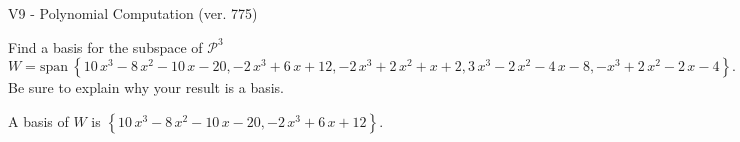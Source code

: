 \begin{exercise}
  \begin{exerciseTitle}V9 - Polynomial Computation (ver. 775)\end{exerciseTitle}
  \begin{exerciseStatement}
    Find a basis for the subspace of \(\mathcal{P}^3\) 
\[W=\mathrm{span}\ \left\{10 \, x^{3} - 8 \, x^{2} - 10 \, x - 20 , -2 \, x^{3} + 6 \, x + 12 , -2 \, x^{3} + 2 \, x^{2} + x + 2 , 3 \, x^{3} - 2 \, x^{2} - 4 \, x - 8 , -x^{3} + 2 \, x^{2} - 2 \, x - 4\right\}.\]
 Be sure to explain why your result is a basis.


  \end{exerciseStatement}
  \begin{exerciseAnswer}
   A basis of \(W\) is  \(\left\{10 \, x^{3} - 8 \, x^{2} - 10 \, x - 20 , -2 \, x^{3} + 6 \, x + 12\right\}\).
  


  \end{exerciseAnswer}
\end{exercise}